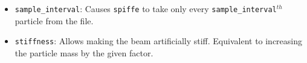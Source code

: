 \begin{itemize}
\begin{itemize}
\item {\tt sample\_interval}: Causes \verb|spiffe| to take only every
  {\tt sample\_interval}$^{th}$ particle from the file.

\item {\tt stiffness}: Allows making the beam artificially stiff.  Equivalent
  to increasing the particle mass by the given factor.

\end{itemize}

\end{itemize}


